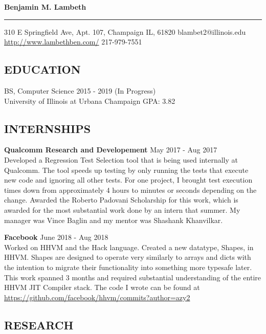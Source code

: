 \documentclass[10pt, letterpaper]{article}
\begin{document}
\par

{\centering
\textbf{\LARGE{Benjamin M. Lambeth}}
\smallskip
\hrule \par}

310 E Springfield Ave, Apt. 107, Champaign IL, 61820 \hfill blambet2@illinois.edu \\ \href{http://www.lambethben.com/}{http://www.lambethben.com/} \hfill 217-979-7551

\smallskip
{\centering \subsection*{EDUCATION} \par}

BS, Computer Science \hfill 2015 - 2019 (In Progress) \\
University of Illinois at Urbana Champaign \hfill GPA: 3.82

\smallskip
{\centering \subsection*{INTERNSHIPS} \par}

\textbf{Qualcomm Research and Developement} \hfill May 2017 - Aug 2017 \\
Developed a Regression Test Selection tool that is being used internally
at Qualcomm. The tool speeds up testing by only running the tests that execute
new code and ignoring all other tests. For one project, I brought test execution times down from
approximately 4 hours to minutes or seconds depending on the change. Awarded the
Roberto Padovani Scholarship for this work, which is awarded for the most
substantial work done by an intern that summer. My manager was
Vince Baglin and my mentor was Shashank Khanvilkar.

\textbf{Facebook} \hfill June 2018 - Aug 2018 \\
Worked on HHVM and the Hack language. Created a new datatype, Shapes, in HHVM.
Shapes are designed to operate very similarly to arrays and dicts with the
intention to migrate their functionality into something more typesafe later.
This work spanned 3 months and required substantial understanding of the entire
HHVM JIT Compiler stack. The code I wrote can be found at
\href{https://github.com/facebook/hhvm/commits?author=azy2}{https://github.com/facebook/hhvm/commits?author=azy2}

\smallskip
{\centering \subsection*{RESEARCH} \par}
\end{document}
